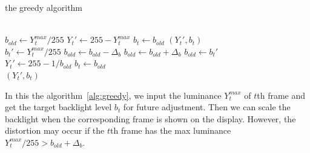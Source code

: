 \begin{algorithm}
  \caption{the greedy algorithm}
  \label{alg:greedy}
  \begin{algorithmic}[1]
    \\
      \State $b_{old} \gets Y_{t}^{max} / 255$
      \State $Y_{t}' \gets 255 - Y_{t}^{max}$
      \State $b_{t} \gets b_{old}$
      \Return $(Y_{t}', b_t)$
    \EndIf
      \\
      \State $b_{t}' \gets Y_{t}^{max} / 255$
      \State $b_{old} \gets b_{old} - \Delta_{b}$
      \State $b_{old} \gets b_{old} + \Delta_{b}$
    \Else
      \State $b_{old} \gets b_{t}'$
    \EndIf
    \\
    \State $Y_{t}' \gets 255 - 1 / b_{old}$
    \State $b_{t} \gets b_{old}$\\
    \Return $(Y_{t}', b_{t})$
  \end{algorithmic}
  
\end{algorithm}

In this the algorithm~\ref{alg:greedy}, we input the luminance
$Y_{t}^{max}$ of $t$th frame and get the target backlight level
$b_{t}$ for future adjustment. Then we can scale the backlight when
the corresponding frame is shown on the display. However, the distortion
may occur if the $t$th frame has the max luminance $Y_t^{max}/255 >
b_{old} + \Delta_b$.






